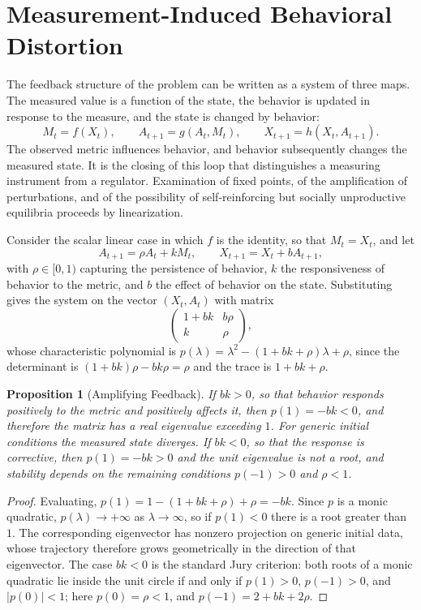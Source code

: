 \documentclass[11pt]{report}
\newtheorem{proposition}[theorem]{Proposition}
\theoremstyle{definition}
\theoremstyle{remark}
\begin{document}
\section{Measurement-Induced Behavioral Distortion}

The feedback structure of the problem can be written as a system of three maps. The measured value is a function of the state, the behavior is updated in response to the measure, and the state is changed by behavior:
\[
M_t=f(X_t),\qquad A_{t+1}=g(A_t,M_t),\qquad X_{t+1}=h(X_t,A_{t+1}).
\]
The observed metric influences behavior, and behavior subsequently changes the measured state. It is the closing of this loop that distinguishes a measuring instrument from a regulator. Examination of fixed points, of the amplification of perturbations, and of the possibility of self-reinforcing but socially unproductive equilibria proceeds by linearization.

Consider the scalar linear case in which $f$ is the identity, so that $M_t=X_t$, and let
\[
A_{t+1}=\rho A_t+kM_t,\qquad X_{t+1}=X_t+bA_{t+1},
\]
with $\rho\in[0,1)$ capturing the persistence of behavior, $k$ the responsiveness of behavior to the metric, and $b$ the effect of behavior on the state. Substituting gives the system on the vector $(X_t,A_t)$ with matrix
\[
\begin{pmatrix}1+bk & b\rho\\ k&\rho\end{pmatrix},
\]
whose characteristic polynomial is $p(\lambda)=\lambda^2-(1+bk+\rho)\lambda+\rho$, since the determinant is $(1+bk)\rho-bk\rho=\rho$ and the trace is $1+bk+\rho$.

\begin{proposition}[Amplifying Feedback]\label{prop:amplify}
If $bk>0$, so that behavior responds positively to the metric and positively affects it, then $p(1)=-bk<0$, and therefore the matrix has a real eigenvalue exceeding $1$. For generic initial conditions the measured state diverges. If $bk<0$, so that the response is corrective, then $p(1)=-bk>0$ and the unit eigenvalue is not a root, and stability depends on the remaining conditions $p(-1)>0$ and $\rho<1$.
\end{proposition}

\begin{proof}
Evaluating, $p(1)=1-(1+bk+\rho)+\rho=-bk$. Since $p$ is a monic quadratic, $p(\lambda)\to+\infty$ as $\lambda\to\infty$, so if $p(1)<0$ there is a root greater than $1$. The corresponding eigenvector has nonzero projection on generic initial data, whose trajectory therefore grows geometrically in the direction of that eigenvector. The case $bk<0$ is the standard Jury criterion: both roots of a monic quadratic lie inside the unit circle if and only if $p(1)>0$, $p(-1)>0$, and $|p(0)|<1$; here $p(0)=\rho<1$, and $p(-1)=2+bk+2\rho$.
\end{proof}
\end{document}
